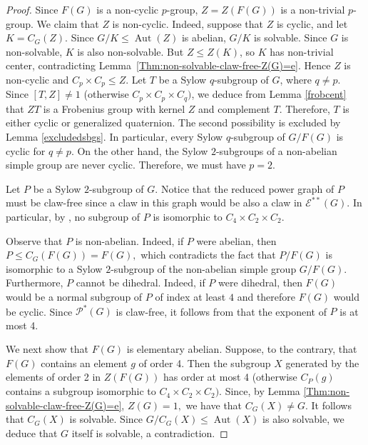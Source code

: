 \documentclass[preprint,11pt]{elsarticle}
\newcommand{\aut}{\operatorname{Aut}}
\begin{document}
\begin{proof}
Since $F(G)$ is a non-cyclic $p$-group, $Z=Z(F(G))$ is a non-trivial $p$-group. We claim that $Z$ is non-cyclic. Indeed, suppose that $Z$ is cyclic, and let $K=C_G(Z)$. Since $G/K\leq\operatorname{Aut}(Z)$ is abelian, $G/K$ is solvable. Since $G$ is non-solvable, $K$ is also non-solvable. But $Z\leq Z(K)$, so $K$ has non-trivial center, contradicting Lemma~\ref{Thm:non-solvable-claw-free-Z(G)=e}. Hence $Z$ is non-cyclic and $C_p\times C_p\leq Z.$ 
Let $T$ be a Sylow $q$-subgroup of $G$, where $q\neq p$. Since $[T,Z]\neq 1$ (otherwise $C_p\times C_p\times C_q)$, we deduce from Lemma \ref{frobcent} that $ZT$ is a Frobenius group with kernel $Z$ and complement $T$.
Therefore, $T$ is either cyclic or generalized quaternion.
The second possibility is excluded by Lemma \ref{excludedsbgs}. 
In particular, every Sylow $q$-subgroup of $G/F(G)$ is cyclic for $q\neq p$. On the other hand, the Sylow $2$-subgroups of a non-abelian simple group are never cyclic. Therefore, we must have $p=2$. %

Let $P$ be a Sylow $2$-subgroup of $G$. Notice that the reduced power graph of $P$ must be claw-free since a claw in this graph would be also a claw in $\mathcal E^{**}(G).$ In particular, by \cite[Lemma~2.3]{claw-free-pwr-graph}, no subgroup of $P$ is isomorphic to $C_4\times  C_2\times  C_2.$



Observe that $P$ is non-abelian. Indeed, if $P$ were abelian, then
$P \leq C_G(F(G)) = F(G),$
which contradicts the fact that $P/F(G)$ is isomorphic to a Sylow $2$-subgroup of the non-abelian simple group $G/F(G)$.
Furthermore, $P$ cannot be dihedral. Indeed, if $P$ were dihedral, then $F(G)$ would be a normal subgroup of $P$ of index at least $4$ and therefore $F(G)$ would be cyclic. Since $\mathcal{P}^*(G)$ is claw-free, it follows from \cite[Proposition~2.6]{claw-free-pwr-graph} that the exponent of $P$ is at most 4.

We next show that \(F(G)\) is elementary abelian. 
Suppose, to the contrary, that $F(G)$ contains an element $g$ of order 4. Then the subgroup $X$ generated by the elements of order 2 in $Z(F(G))$ has order at most 4 (otherwise $C_P(g)$ contains a subgroup isomorphic to $C_4\times C_2\times C_2)$. Since, by Lemma \ref{Thm:non-solvable-claw-free-Z(G)=e}, $Z(G)=1,$ we have that $C_G(X)\neq G$. It follows that $C_G(X)$ is solvable. Since $G/C_G(X)\leq \aut(X)$ is also solvable, we deduce that $G$ itself is solvable, a contradiction.


\end{proof}
\end{document}
